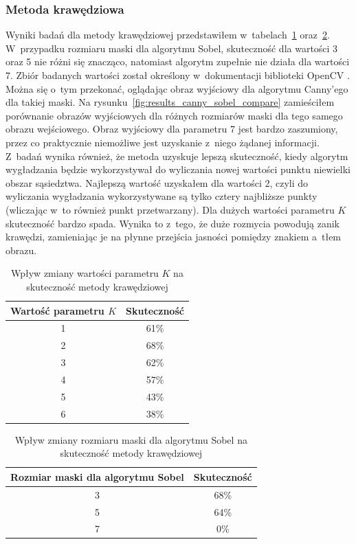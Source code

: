 \subsubsection{Metoda krawędziowa}
Wyniki badań dla metody krawędziowej przedstawiłem w~tabelach~\ref{tab:metoda_krawedziowa_param_s} oraz~\ref{tab:metoda_krawedziowa_sobel}. W~przypadku rozmiaru maski dla algorytmu Sobel, skuteczność dla wartości 3 oraz 5 nie różni się znacząco, natomiast algorytm zupełnie nie działa dla wartości 7. Zbiór badanych wartości został określony w~dokumentacji biblioteki OpenCV \cite{opencv}. Można się o~tym przekonać, oglądając obraz wyjściowy dla algorytmu Canny'ego dla takiej maski. Na rysunku~\ref{fig:results_canny_sobel_compare} zamieściłem porównanie obrazów wyjściowych dla różnych rozmiarów maski dla tego samego obrazu wejściowego. Obraz wyjściowy dla parametru 7 jest bardzo zaszumiony, przez co praktycznie niemożliwe jest uzyskanie z~niego żądanej informacji. \\
 Z~badań wynika również, że metoda uzyskuje lepszą skuteczność, kiedy algorytm wygładzania będzie wykorzystywał do wyliczania nowej wartości punktu niewielki obszar sąsiedztwa. Najlepszą wartość uzyskałem dla wartości 2, czyli do wyliczania wygładzania wykorzystywane są tylko cztery najbliższe punkty (wliczając w~to również punkt przetwarzany). Dla dużych wartości parametru $K$ skuteczność bardzo spada. Wynika to z~tego, że duże rozmycia powodują zanik krawędzi, zamieniając je na płynne przejścia jasności pomiędzy znakiem a~tłem obrazu.
\begin {table}
  \begin{center}
    \begin{tabular}{c | c}
      Wartość parametru $K$ & Skuteczność \\
      \hline
      1 & 61\% \\
      2 & 68\% \\
      3 & 62\% \\
      4 & 57\% \\
      5 & 43\% \\
      6 & 38\% 
    \end{tabular}
    \caption {Wpływ zmiany wartości parametru $K$ na skuteczność metody krawędziowej}
    \label{tab:metoda_krawedziowa_param_s} 
  \end{center}
\end {table}

\begin {table}
  \begin{center}
    \begin{tabular}{c | c}
      Rozmiar maski dla algorytmu Sobel & Skuteczność \\
      \hline
      3 & 68\% \\
      5 & 64\% \\
      7 & 0\% 
    \end{tabular}
    \caption {Wpływ zmiany rozmiaru maski dla algorytmu Sobel na skuteczność metody krawędziowej}
    \label{tab:metoda_krawedziowa_sobel} 
  \end{center}
\end {table}


